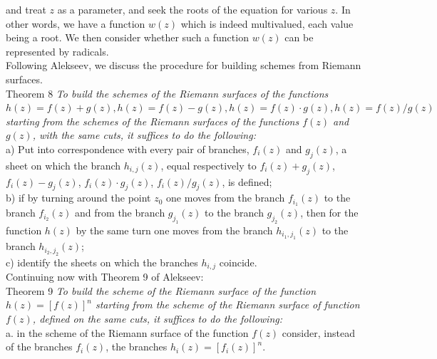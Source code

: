and treat $z$ as a parameter, and seek the roots of the equation for various $z$.  In other words, we have a function $w\left(z\right)$ which is indeed multivalued, each value being a root.  We then consider whether such a function $w\left(z\right)$ can be represented by radicals.\\

Following Alekseev, we discuss the procedure for building schemes from Riemann surfaces.\\

Theorem 8 \textit{To build the schemes of the Riemann surfaces of the functions $h\left(z\right)=f\left(z\right)+g\left(z\right), h\left(z\right)=f\left(z\right)-g\left(z\right), h\left(z\right)=f\left(z\right) \cdot g\left(z\right), h\left(z\right)=f\left(z\right)/g\left(z\right)$ starting from the schemes of the Riemann surfaces of the functions $f\left(z\right)$ and $g\left(z\right)$, with the same cuts, it suffices to do the following:}\\

a) Put into correspondence with every pair of branches, $f_{i}\left(z\right)$ and $g_{j}\left(z\right)$, a sheet on which the branch $h_{i,j}\left(z\right)$, equal respectively to $f_{i}\left(z\right)+g_{j}\left(z\right)$, $f_{i}\left(z\right)-g_{j}\left(z\right)$, $f_{i}\left(z\right) \cdot g_{j}\left(z\right)$, $f_{i}\left(z\right)/g_{j}\left(z\right)$, is defined; \\
b) if by turning around the point $z_{0}$ one moves from the branch $f_{i_{1}}\left(z\right)$ to the branch $f_{i_{2}}\left(z\right)$ and from the branch $g_{j_{1}}\left(z\right)$ to the branch $g_{j_{2}}\left(z\right)$, then for the function $h\left(z\right)$ by the same turn one moves from the branch $h_{i_{1},j_{1}}\left(z\right)$ to the branch $h_{i_{2},j_{2}}\left(z\right)$;\\
c) identify the sheets on which the branches $h_{i,j}$ coincide.\\

Continuing now with Theorem 9 of Alekseev:\\

Theorem 9 \textit{To build the scheme of the Riemann surface of the function $h\left(z\right)=\left[f\left(z\right)\right]^{n}$ starting from the scheme of the Riemann surface of function $f\left(z\right)$, defined on the same cuts, it suffices to do the following:} \\

a. in the scheme of the Riemann surface of the function $f\left(z\right)$ consider, instead of the branches $f_{i}\left(z\right)$, the branches $h_{i}\left(z\right)=\left[f_{i}\left(z\right)\right]^{n}$.
  
